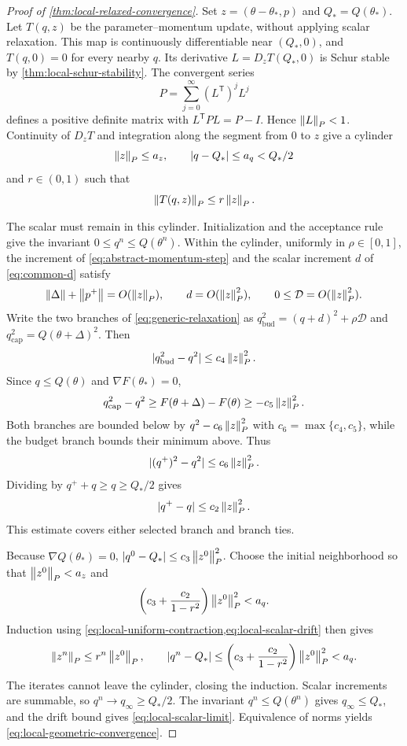 \begin{proof}[Proof of \cref{thm:local-relaxed-convergence}]
Set \(z=(\theta-\theta_*,p)\) and \(Q_*=Q(\theta_*)\). Let
\(T(q,z)\) be the parameter--momentum update, without applying scalar
relaxation. This map is continuously differentiable near \((Q_*,0)\), and
\(T(q,0)=0\) for every nearby \(q\). Its derivative
\(L=D_zT(Q_*,0)\) is Schur stable by
\cref{thm:local-schur-stability}. The convergent series
\[
  P=\sum_{j=0}^{\infty}(L^{\mathsf T})^jL^j
\]
defines a positive definite matrix with
\(L^{\mathsf T}PL=P-I\). Hence \(\left\lVert L\right\rVert_P<1\).
Continuity of \(D_zT\) and integration along the segment from \(0\) to
\(z\) give a cylinder
\[
  \left\lVert z\right\rVert_P\leq a_z,\qquad |q-Q_*|\leq a_q<Q_*/2
\]
and \(r\in(0,1)\) such that
\begin{equation}
  \left\lVert T(q,z)\right\rVert_P\leq r\left\lVert z\right\rVert_P.
  \label{eq:local-uniform-contraction}
\end{equation}

The scalar must remain in this cylinder. Initialization and the acceptance
rule give the invariant \(0\leq q^n\leq Q(\theta^n)\). Within the cylinder,
uniformly in \(\rho\in[0,1]\), the increment of
\cref{eq:abstract-momentum-step} and the scalar increment \(d\) of
\cref{eq:common-d} satisfy
\[
  \left\lVert\Delta\right\rVert+\left\lVert p^+\right\rVert=O(\left\lVert z\right\rVert_P),\qquad
  d=O(\left\lVert z\right\rVert_P^2),\qquad
  0\leq\mathcal D=O(\left\lVert z\right\rVert_P^2).
\]
Write the two branches of \cref{eq:generic-relaxation} as
\(q_{\mathrm{bud}}^2=(q+d)^2+\rho\mathcal D\) and
\(q_{\mathrm{cap}}^2=Q(\theta+\Delta)^2\). Then
\[
  |q_{\mathrm{bud}}^2-q^2|\leq c_4\left\lVert z\right\rVert_P^2.
\]
Since \(q\leq Q(\theta)\) and \(\nabla F(\theta_*)=0\),
\[
  q_{\mathrm{cap}}^2-q^2\geq F(\theta+\Delta)-F(\theta)
  \geq-c_5\left\lVert z\right\rVert_P^2.
\]
Both branches are bounded below by \(q^2-c_6\left\lVert z\right\rVert_P^2\) with
\(c_6=\max\{c_4,c_5\}\), while the budget branch bounds their minimum
above. Thus
\[
  |(q^+)^2-q^2|\leq c_6\left\lVert z\right\rVert_P^2.
\]
Dividing by \(q^++q\geq q\geq Q_*/2\) gives
\begin{equation}
  |q^+-q|\leq c_2\left\lVert z\right\rVert_P^2.
  \label{eq:local-scalar-drift}
\end{equation}
This estimate covers either selected branch and branch ties.

Because \(\nabla Q(\theta_*)=0\),
\(|q^0-Q_*|\leq c_3\left\lVert z^0\right\rVert_P^2\). Choose the initial neighborhood
so that \(\left\lVert z^0\right\rVert_P<a_z\) and
\[
  \left(c_3+\frac{c_2}{1-r^2}\right)\left\lVert z^0\right\rVert_P^2<a_q.
\]
Induction using \cref{eq:local-uniform-contraction,eq:local-scalar-drift}
then gives
\[
  \left\lVert z^n\right\rVert_P\leq r^n\left\lVert z^0\right\rVert_P,
  \qquad
  |q^n-Q_*|
  \leq\left(c_3+\frac{c_2}{1-r^2}\right)\left\lVert z^0\right\rVert_P^2<a_q.
\]
The iterates cannot leave the cylinder, closing the induction. Scalar
increments are summable, so \(q^n\to q_\infty\geq Q_*/2\). The invariant
\(q^n\leq Q(\theta^n)\) gives \(q_\infty\leq Q_*\), and the drift
bound gives \cref{eq:local-scalar-limit}. Equivalence of norms yields
\cref{eq:local-geometric-convergence}.
\end{proof}

